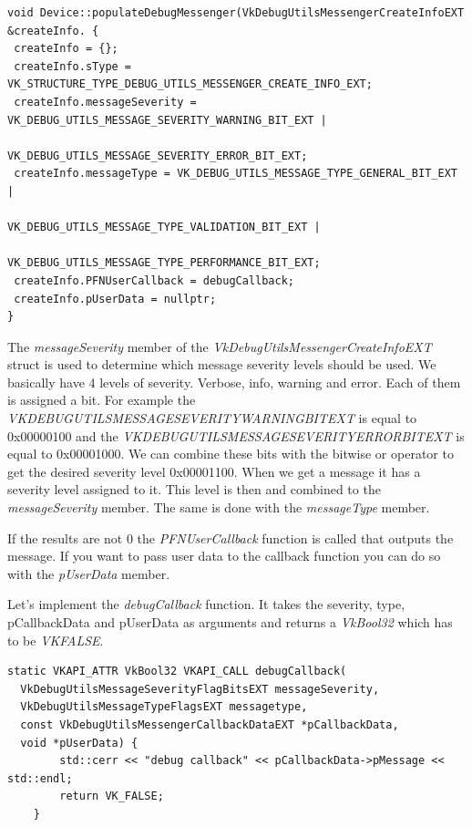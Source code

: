 \documentclass[12pt]{report} \usepackage{preamble}
\begin{document}
\begin{lstlisting}[Language=C++]
void Device::populateDebugMessenger(VkDebugUtilsMessengerCreateInfoEXT &createInfo. {
 createInfo = {};
 createInfo.sType = VK_STRUCTURE_TYPE_DEBUG_UTILS_MESSENGER_CREATE_INFO_EXT;
 createInfo.messageSeverity = VK_DEBUG_UTILS_MESSAGE_SEVERITY_WARNING_BIT_EXT |
                              VK_DEBUG_UTILS_MESSAGE_SEVERITY_ERROR_BIT_EXT;
 createInfo.messageType = VK_DEBUG_UTILS_MESSAGE_TYPE_GENERAL_BIT_EXT |
                         VK_DEBUG_UTILS_MESSAGE_TYPE_VALIDATION_BIT_EXT |
                         VK_DEBUG_UTILS_MESSAGE_TYPE_PERFORMANCE_BIT_EXT;
 createInfo.PFNUserCallback = debugCallback;
 createInfo.pUserData = nullptr;
}
\end{lstlisting}

The \textit{messageSeverity} member of the  \textit{VkDebugUtilsMessengerCreateInfoEXT} struct
is used to determine which message severity levels should be used. We basically have 4 levels of
severity. Verbose, info, warning and error. Each of them is assigned a bit. For example the \\
\textit{VK\textunderscore DEBUG\textunderscore UTILS\textunderscore MESSAGE\textunderscore SEVERITY\textunderscore WARNING\textunderscore BIT\textunderscore EXT}
is equal to \\ 0x00000100 and the
\textit{VK\textunderscore DEBUG\textunderscore UTILS\textunderscore MESSAGE\textunderscore SEVERITY\textunderscore ERROR\textunderscore BIT\textunderscore EXT}
is equal to 0x00001000. We can combine these bits with the bitwise or operator to get the desired severity level
0x00001100. When we get a message it has a severity level assigned to it. This level is then and combined to the
\textit{messageSeverity} member. The same is done with the \textit{messageType} member.

If the results are not 0 the \textit{PFNUserCallback} function is called that
outputs the message.  If you want to pass user data to the callback function you can do so with the
\textit{pUserData} member.

Let's implement the \textit{debugCallback} function.
It takes the severity, type, pCallbackData and pUserData as arguments and returns a \textit{VkBool32}
which has to be \textit{VK\textunderscore FALSE}.

\begin{lstlisting}[Language=C++]
static VKAPI_ATTR VkBool32 VKAPI_CALL debugCallback(
  VkDebugUtilsMessageSeverityFlagBitsEXT messageSeverity,
  VkDebugUtilsMessageTypeFlagsEXT messagetype,
  const VkDebugUtilsMessengerCallbackDataEXT *pCallbackData,
  void *pUserData) {
		std::cerr << "debug callback" << pCallbackData->pMessage << std::endl;
		return VK_FALSE;
	}
\end{lstlisting}
\end{document}

